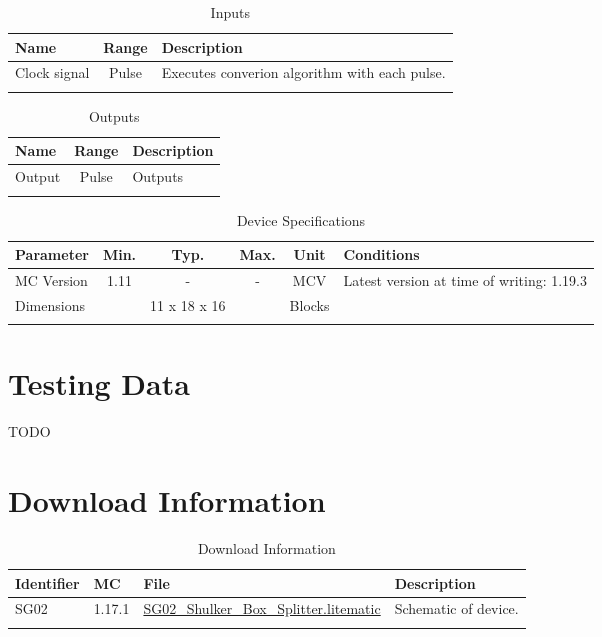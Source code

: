 \documentclass[10pt]{datasheet}
\begin{document}
\begin{table}[h]
    \caption{Inputs}
    \begin{tabularx}{\textwidth}{l | c | X}
        \thickhline
        \textbf{Name} & \textbf{Range} & \textbf{Description} \\
        \hline
        Clock signal & Pulse & Executes converion algorithm with each pulse. \\
        \thickhline
\end{tabularx}
\end{table}

\begin{table}[h]
    \caption{Outputs}
    \begin{tabularx}{\textwidth}{l | c | X}
        \thickhline
        \textbf{Name} & \textbf{Range} & \textbf{Description} \\
        \hline
        Output & Pulse & Outputs \\
        \thickhline
\end{tabularx}
\end{table}

\begin{table}[h]
    \caption{Device Specifications}
    \begin{tabularx}{\textwidth}{l | c c c | c | X}
        \thickhline
        \textbf{Parameter} & \textbf{Min.} & \textbf{Typ.} & \textbf{Max.} &
        \textbf{Unit} & \textbf{Conditions} \\
        \hline
        MC Version & 1.11 & - & - & MCV & Latest version at time of writing: 1.19.3\\
        \hline
        Dimensions & & 11 x 18 x 16 & & Blocks & \\
        \thickhline
\end{tabularx}
\end{table}
\newpage
\section{Testing Data}

TODO

\section{Download Information}
\begin{table}[h]
    \caption{Download Information}
    \begin{tabularx}{\textwidth}{l | l | l | X}
        \thickhline
        \textbf{Identifier} & \textbf{MC} & \textbf{File} & \textbf{Description} \\
        \hline
        SG02 & 1.17.1 & \href{https://github.com/Soontech-Annals/Archive/blob/92d3541e07ddc3ab90360e923907f040eca76834/Archive/splitting/SG02\%20Shulker\%20Box\%20Splitter/SG02\_Shulker\_Box\_Splitter.litematic?raw=1}{SG02\_Shulker\_Box\_Splitter.litematic} & Schematic of device. \\
        \hline
        \thickhline
    \end{tabularx}
\end{table}
\end{document}

